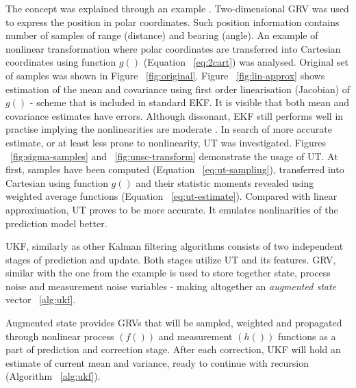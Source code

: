 The concept was explained through an example \cite{ristic04}. Two-dimensional GRV was used to express the position in polar coordinates. Such position information contains number of samples of range (distance) and bearing (angle). An example of nonlinear transformation where polar coordinates are transferred into Cartesian coordinates using function $g()$ (Equation ~\ref{eq:2cart}) was analysed. Original set of samples was shown in Figure ~\ref{fig:original}. Figure ~\ref{fig:lin-approx} shows estimation of the mean and covariance using first order linearisation (Jacobian) of $g()$ - scheme that is included in standard EKF. It is visible that both mean and covariance estimates have errors. Although dissonant, EKF still performs well in practise implying the nonlinearities are moderate \cite{ristic04}. In search of more accurate estimate, or at least less prone to nonlinearity, UT was investigated. Figures ~\ref{fig:sigma-samples} and ~\ref{fig:unsc-transform} demonstrate the usage of UT. At first, samples have been computed (Equation ~\ref{eq:ut-sampling}), transferred into Cartesian using function $g()$ and their statistic moments revealed using weighted average functions (Equation ~\ref{eq:ut-estimate}). Compared with linear approximation, UT proves to be more accurate. It emulates nonlinarities of the prediction model better.

UKF, similarly as other Kalman filtering algorithms consists of two independent stages of prediction and update. Both stages utilize UT and its features. GRV, similar with the one from the example is used to store together state, process noise and measurement noise variables - making altogether an \textit{augmented state} vector ~\ref{alg:ukf}.

Augmented state provides GRVs that will be sampled, weighted and propagated through nonlinear process $(f())$ and measurement $(h())$ functions as a part of prediction and correction stage. After each correction, UKF will hold an estimate of current mean and variance, ready to continue with recursion (Algorithm ~\ref{alg:ukf}).   

